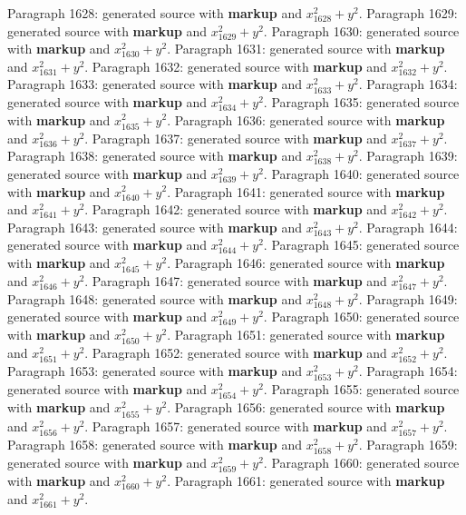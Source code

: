 \documentclass{article}
\begin{document}
Paragraph 1628: generated source with \textbf{markup} and $x_{1628}^2 + y^2$.
Paragraph 1629: generated source with \textbf{markup} and $x_{1629}^2 + y^2$.
Paragraph 1630: generated source with \textbf{markup} and $x_{1630}^2 + y^2$.
Paragraph 1631: generated source with \textbf{markup} and $x_{1631}^2 + y^2$.
Paragraph 1632: generated source with \textbf{markup} and $x_{1632}^2 + y^2$.
Paragraph 1633: generated source with \textbf{markup} and $x_{1633}^2 + y^2$.
Paragraph 1634: generated source with \textbf{markup} and $x_{1634}^2 + y^2$.
Paragraph 1635: generated source with \textbf{markup} and $x_{1635}^2 + y^2$.
Paragraph 1636: generated source with \textbf{markup} and $x_{1636}^2 + y^2$.
Paragraph 1637: generated source with \textbf{markup} and $x_{1637}^2 + y^2$.
Paragraph 1638: generated source with \textbf{markup} and $x_{1638}^2 + y^2$.
Paragraph 1639: generated source with \textbf{markup} and $x_{1639}^2 + y^2$.
Paragraph 1640: generated source with \textbf{markup} and $x_{1640}^2 + y^2$.
Paragraph 1641: generated source with \textbf{markup} and $x_{1641}^2 + y^2$.
Paragraph 1642: generated source with \textbf{markup} and $x_{1642}^2 + y^2$.
Paragraph 1643: generated source with \textbf{markup} and $x_{1643}^2 + y^2$.
Paragraph 1644: generated source with \textbf{markup} and $x_{1644}^2 + y^2$.
Paragraph 1645: generated source with \textbf{markup} and $x_{1645}^2 + y^2$.
Paragraph 1646: generated source with \textbf{markup} and $x_{1646}^2 + y^2$.
Paragraph 1647: generated source with \textbf{markup} and $x_{1647}^2 + y^2$.
Paragraph 1648: generated source with \textbf{markup} and $x_{1648}^2 + y^2$.
Paragraph 1649: generated source with \textbf{markup} and $x_{1649}^2 + y^2$.
Paragraph 1650: generated source with \textbf{markup} and $x_{1650}^2 + y^2$.
Paragraph 1651: generated source with \textbf{markup} and $x_{1651}^2 + y^2$.
Paragraph 1652: generated source with \textbf{markup} and $x_{1652}^2 + y^2$.
Paragraph 1653: generated source with \textbf{markup} and $x_{1653}^2 + y^2$.
Paragraph 1654: generated source with \textbf{markup} and $x_{1654}^2 + y^2$.
Paragraph 1655: generated source with \textbf{markup} and $x_{1655}^2 + y^2$.
Paragraph 1656: generated source with \textbf{markup} and $x_{1656}^2 + y^2$.
Paragraph 1657: generated source with \textbf{markup} and $x_{1657}^2 + y^2$.
Paragraph 1658: generated source with \textbf{markup} and $x_{1658}^2 + y^2$.
Paragraph 1659: generated source with \textbf{markup} and $x_{1659}^2 + y^2$.
Paragraph 1660: generated source with \textbf{markup} and $x_{1660}^2 + y^2$.
Paragraph 1661: generated source with \textbf{markup} and $x_{1661}^2 + y^2$.
\end{document}
